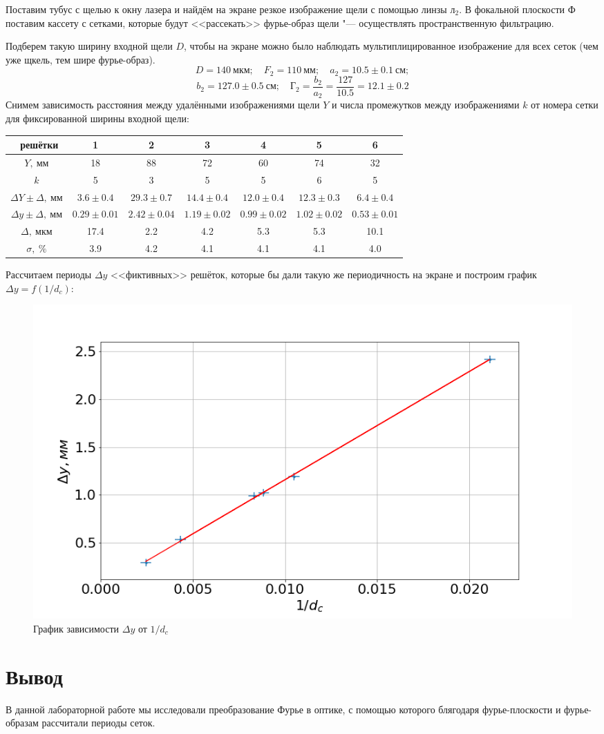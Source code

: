 \documentclass[10pt, a4paper]{article}
\begin{document}
Поставим тубус с щелью к окну лазера и найдём на экране резкое изображение щели с помощью линзы $л_2$. В фокальной плоскости Ф поставим кассету с сетками, которые будут <<рассекать>> фурье-образ щели "--- осуществлять пространственную фильтрацию.

Подберем такую ширину входной щели $D$, чтобы на экране можно было наблюдать мультиплицированное изображение для всех сеток (чем уже щкель, тем шире фурье-образ).
\[
D = 140\ мкм; \quad F_2 = 110\ мм; \quad a_2  = 10.5 \pm 0.1\ см; 
\]
\[
b_2 = 127.0 \pm 0.5\ см; \quad Г_2 = \frac{b_2}{a_2} = \frac{127}{10.5} = 12.1 \pm 0.2
\]
Снимем зависимость расстояния между удалёнными изображениями щели $Y$ и числа промежутков между изображениями $k$ от номера сетки для фиксированной ширины входной щели:
\begin{table}[H]
	\centering
	\begin{tabular}{|c|c|c|c|c|c|c|}  \hline
	\textnumero\ решётки & 1 & 2 & 3 & 4 & 5 & 6 \\\hline
	$Y,\ мм$ & 18 & 88 & 72 & 60 & 74 & 32 \\\hline
	$k$ & 5 & 3 & 5 & 5 & 6 & 5\\\hline
	$\Delta Y \pm \Delta,\ мм$ & $3.6 \pm 0.4$ & $29.3 \pm 0.7$ & $14.4 \pm 0.4$ & $12.0 \pm 0.4$ & $12.3 \pm 0.3$ & $6.4 \pm 0.4$ \\\hline
	
	$\Delta y \pm \Delta,\ мм$ & $0.29 \pm 0.01$ & $2.42 \pm 0.04$ & $1.19 \pm 0.02$ & $0.99 \pm 0.02$ & $1.02 \pm 0.02$ & $0.53 \pm 0.01$ \\\hline
	$\Delta,\ мкм$ & 17.4 & 2.2 & 4.2 & 5.3 & 5.3 & 10.1 \\\hline
	$\sigma,\ \%$ & 3.9 & 4.2 & 4.1 & 4.1 & 4.1 & 4.0 \\\hline
	\end{tabular}
	\end{table}
	Рассчитаем периоды $\Delta y$ <<фиктивных>> решёток, которые бы дали такую же периодичность на экране и построим график $\Delta y = f(1/ d_c)$:
	\begin{figure}[H]
	\includegraphics[width = 1.0\linewidth]{g2.png}
	\caption*{График зависимости $\Delta y$ от $1 / d_c$}
\end{figure}
\section*{Вывод}
В данной лабораторной работе мы исследовали преобразование Фурье в оптике, с помощью которого блягодаря фурье-плоскости и фурье-образам рассчитали периоды сеток.
 
\end{document}
